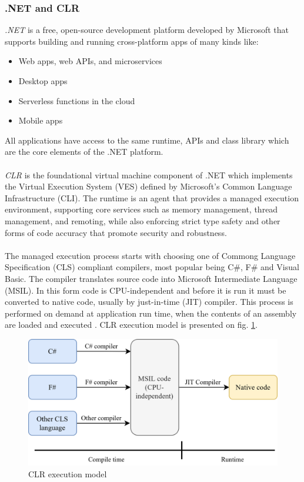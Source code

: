 \subsubsection{.NET and CLR}
\emph{.NET} is a free, open-source development platform developed by Microsoft that supports building and running cross-platform apps of many kinds like:
\begin{itemize}
	\item Web apps, web APIs, and microservices
	\item Desktop apps
	\item Serverless functions in the cloud
	\item Mobile apps
\end{itemize}

All applications have access to the same runtime, APIs and class library which are the core elements of the .NET platform.
\\ \\ 
\emph{CLR} is the foundational virtual machine component of .NET which implements the Virtual Execution System (VES) defined by Microsoft's Common Language Infrastructure (CLI). The runtime is an agent that provides a managed execution environment, supporting core services such as memory management, thread management, and remoting, while also enforcing strict type safety and other forms of code accuracy that promote security and robustness. \cite{IntroductionToNet}
\\ \\ 
The managed execution process starts with choosing one of Commong Language Specification (CLS) compliant compilers, most popular being C\#, F\# and Visual Basic. The compiler translates source code into Microsoft Intermediate Language (MSIL). In this form code is CPU-independent and before it is run it must be converted to native code, usually by just-in-time (JIT) compiler. This process is performed on demand at application run time, when the contents of an assembly are loaded and executed \cite{ManagedExecution}.
CLR execution model is presented on fig. \ref{fig:clr}.

\begin{figure}[htb]
	\centering
		\includegraphics[scale=1.0]{figures02/clr.png}
	\caption{CLR execution model}
	\label{fig:clr}
\end{figure}


